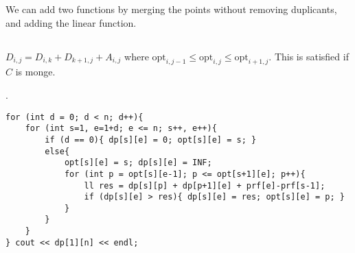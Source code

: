 \documentclass[landscape, 8pt, a4paper, oneside, twocolumn]{extarticle}
\begin{document}
We can add two functions by merging the points without removing duplicants, and adding the linear function.
\subsection{}
$D_{i,j} = D_{i,k} + D_{k+1,j} + A_{i,j}$ where $\mathrm{opt}_{i,j-1} \le \mathrm{opt}_{i,j} \le \mathrm{opt}_{i+1,j}$.
This is satisfied if $C$ is monge.

.
\begin{verbatim}
for (int d = 0; d < n; d++){
	for (int s=1, e=1+d; e <= n; s++, e++){
		if (d == 0){ dp[s][e] = 0; opt[s][e] = s; }
		else{
			opt[s][e] = s; dp[s][e] = INF;
			for (int p = opt[s][e-1]; p <= opt[s+1][e]; p++){
				ll res = dp[s][p] + dp[p+1][e] + prf[e]-prf[s-1];
				if (dp[s][e] > res){ dp[s][e] = res; opt[s][e] = p; }
			}
		}
	}
} cout << dp[1][n] << endl;
\end{verbatim}
\end{document}
